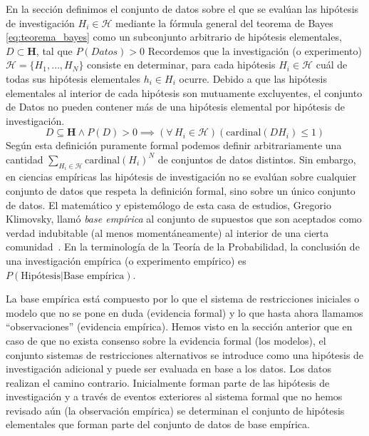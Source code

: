 \documentclass[a4paper,11pt]{book}
\theoremstyle{definition}
\begin{document}
En la secci\'on \emph{} definimos el conjunto de datos sobre el que se eval\'uan las hip\'otesis de investigaci\'on $H_i \in \mathcal{H}$ mediante la f\'ormula general del teorema de Bayes \eqref{eq:teorema_bayes} como un subconjunto arbitrario de hip\'otesis elementales, $D \subset \textbf{H}$, tal que $P(Datos)>0$
%
Recordemos que la investigaci\'on (o experimento) $\mathcal{H} = \{H_1, \dots, H_N\}$ consiste en determinar, para cada hip\'otesis $H_i \in \mathcal{H}$ cu\'al de todas sus hip\'otesis elementales $h_i \in H_i$ ocurre.
%
Debido a que las hip\'otesis elementales al interior de cada hip\'otesis son mutuamente excluyentes, el conjunto de Datos no pueden contener m\'as de una hip\'otesis elemental por hip\'otesis de investigaci\'on.
%
\begin{equation*}
D \subseteq \textbf{H} \land P(D)> 0 \implies (\forall \, H_i \in \mathcal{H})(\text{cardinal}(DH_i) \leq 1)
\end{equation*}
%
Seg\'un esta definici\'on puramente formal podemos definir arbitrariamente una cantidad $\sum_{H_i \in \mathcal{H}} \text{cardinal}(H_i)^N$ de conjuntos de datos distintos.
%
Sin embargo, en ciencias emp\'iricas las hip\'otesis de investigaci\'on no se eval\'uan sobre cualquier conjunto de datos que respeta la definici\'on formal, sino sobre un \'unico conjunto de datos.
%
El matem\'atico y epistem\'ologo de esta casa de estudios, Gregorio Klimovsky, llam\'o \emph{base emp\'irica} al conjunto de supuestos que son aceptados como verdad indubitable (al menos moment\'aneamente) al interior de una cierta comunidad~\cite{klimovsky1994-desventuras}.
%
En la terminolog\'ia de la Teor\'ia de la Probabilidad, la conclusi\'on de una investigaci\'on emp\'irica (o experimento emp\'irico) es $P(\text{Hip\'otesis}|\text{Base emp\'irica})$.


La base emp\'irica est\'a compuesto por lo que el sistema de restricciones iniciales o modelo que no se pone en duda (evidencia formal) y lo que hasta ahora llamamos ``observaciones'' (evidencia emp\'irica).
%
Hemos visto en la secci\'on anterior que en caso de que no exista consenso sobre la evidencia formal (los modelos), el conjunto sistemas de restricciones alternativos se introduce como una hip\'otesis de investigaci\'on adicional y puede ser evaluada en base a los datos.
%
Los datos realizan el camino contrario.
%
Inicialmente forman parte de las hip\'otesis de investigaci\'on y a trav\'es de eventos exteriores al sistema formal que no hemos revisado a\'un (la observaci\'on emp\'irica) se determinan el conjunto de hip\'otesis elementales que forman parte del conjunto de datos de base emp\'irica.
\end{document}
